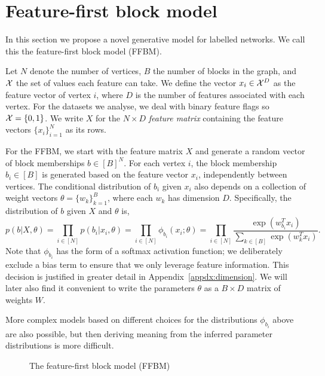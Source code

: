 \section{Feature-first block model}

In this section we propose a novel generative model for labelled networks. We call this the feature-first block model (FFBM).

Let $N$ denote the number of vertices, $B$ the number of blocks in the graph,
and ${\cal X}$ the set of values each feature can take.
We define the vector $x_i \in \mathcal{X}^D$ as the feature vector of vertex $i$, 
where $D$ is the number of features associated with each vertex.
For the datasets we analyse, we deal with binary feature flags so $\mathcal{X} = \{0, 1\}$. We write $X$ for the $N\times D$ {\em feature matrix} containing
the feature vectors $\{x_i\}_{i=1}^{N}$ 
as its rows.

For the FFBM, we start with the feature matrix $X$ and generate a random
vector of block memberships $b \in [B]^N$. For each vertex $i$, the
block membership $b_i\in[B]$ is generated based on the feature
vector $x_i$, independently between vertices. The conditional
distribution of $b_i$ given $x_i$ also depends on a collection
of weight vectors $\theta=\{w_k\}_{k=1}^B$, where each
$w_k$ has dimension $D$. Specifically, 
the distribution of $b$ given $X$ and $\theta$ is,
%
\begin{equation}
	p(b| X, \theta) = \prod_{i \in [N]} p(b_i | x_i, \theta) = \prod_{i \in [N]} \phi_{b_i} (x_i; \theta)
	= \prod_{i \in [N]} \frac{\exp\left(w_{b_i}^T x_i\right)}{\sum_{k \in [B]} \exp \left( w_k^T x_i\right)}.
\end{equation}
%
Note that $\phi_{b_i}$ has the form of a softmax activation function;
we deliberately exclude a bias term to ensure that we only leverage feature information.
This decision is justified in greater detail in Appendix~\ref{appdx:dimension}.
We will later also find it convenient
to write the parameters $\theta$ as a $B \times D$ matrix of weights $W$.

More complex models based on different choices for the distributions
$\phi_{b_i}$ above are also possible, but then deriving meaning from 
the inferred parameter distributions is more difficult. 

\begin{figure}[!h]
	\centering
	\caption{The feature-first block model (FFBM)}
	\label{fig:ffbm}
\end{figure}

